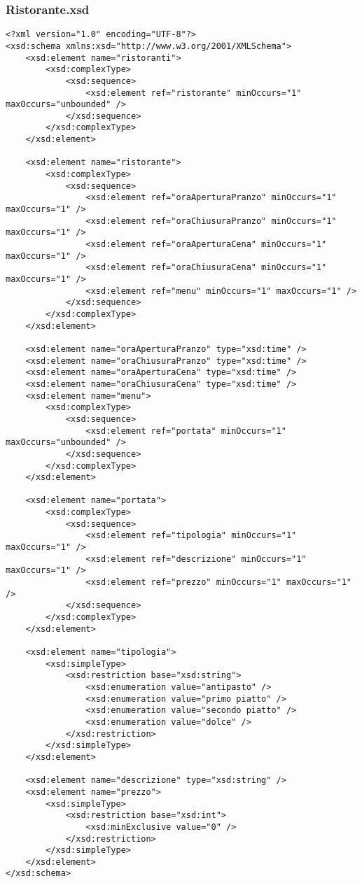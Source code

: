 \documentclass [a4paper, 12pt]{book}
\begin{document}
\subsubsection{Ristorante.xsd}
\begin{lstlisting}[style=XML]
<?xml version="1.0" encoding="UTF-8"?>
<xsd:schema xmlns:xsd="http://www.w3.org/2001/XMLSchema">
    <xsd:element name="ristoranti">
        <xsd:complexType>
            <xsd:sequence>
                <xsd:element ref="ristorante" minOccurs="1" maxOccurs="unbounded" />
            </xsd:sequence>
        </xsd:complexType>
    </xsd:element>

    <xsd:element name="ristorante">
        <xsd:complexType>
            <xsd:sequence>
                <xsd:element ref="oraAperturaPranzo" minOccurs="1" maxOccurs="1" />
                <xsd:element ref="oraChiusuraPranzo" minOccurs="1" maxOccurs="1" />
                <xsd:element ref="oraAperturaCena" minOccurs="1" maxOccurs="1" />
                <xsd:element ref="oraChiusuraCena" minOccurs="1" maxOccurs="1" />
                <xsd:element ref="menu" minOccurs="1" maxOccurs="1" />
            </xsd:sequence>
        </xsd:complexType>
    </xsd:element>

    <xsd:element name="oraAperturaPranzo" type="xsd:time" />
    <xsd:element name="oraChiusuraPranzo" type="xsd:time" />
    <xsd:element name="oraAperturaCena" type="xsd:time" />
    <xsd:element name="oraChiusuraCena" type="xsd:time" />
    <xsd:element name="menu">
        <xsd:complexType>
            <xsd:sequence>
                <xsd:element ref="portata" minOccurs="1" maxOccurs="unbounded" />
            </xsd:sequence>
        </xsd:complexType>
    </xsd:element>

    <xsd:element name="portata">
        <xsd:complexType>
            <xsd:sequence>
                <xsd:element ref="tipologia" minOccurs="1" maxOccurs="1" />
                <xsd:element ref="descrizione" minOccurs="1" maxOccurs="1" />
                <xsd:element ref="prezzo" minOccurs="1" maxOccurs="1" />
            </xsd:sequence>
        </xsd:complexType>
    </xsd:element>

    <xsd:element name="tipologia">
        <xsd:simpleType>
            <xsd:restriction base="xsd:string">
                <xsd:enumeration value="antipasto" />
                <xsd:enumeration value="primo piatto" />
                <xsd:enumeration value="secondo piatto" />
                <xsd:enumeration value="dolce" />
            </xsd:restriction>
        </xsd:simpleType>
    </xsd:element>
    
    <xsd:element name="descrizione" type="xsd:string" />
    <xsd:element name="prezzo">
        <xsd:simpleType>
            <xsd:restriction base="xsd:int">
                <xsd:minExclusive value="0" />
            </xsd:restriction>
        </xsd:simpleType>
    </xsd:element>
</xsd:schema>
\end{lstlisting}
\end{document}
